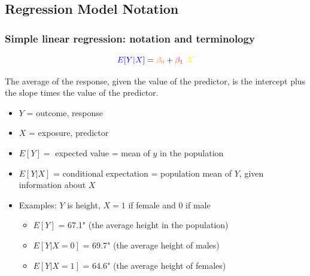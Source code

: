 \documentclass[12pt, 
hyperref={colorlinks=true, linkcolor=blue, urlcolor=cyan},dvipsnames]{beamer}
\begin{document}
\subsection{Regression Model Notation}
\begin{frame}
\frametitle{Simple linear regression: notation and terminology}
$$\color{blue} E[Y|X] \color{black} = \color{orange} \beta_0 \color{black} + \color{red} \beta_1 \color{yellow} \ X$$ \vspace{-0.6cm}

\color{blue}The average of the response, given the value of the predictor, \color{black} is \color{orange} the intercept \color{black} plus \color{red} the slope \color{black} times \color{yellow} the value of the predictor.\color{black} \pause

\vspace{-0.2cm}
\begin{itemize}
\item $Y$ = outcome, response
\item $X$ = exposure, predictor \pause
\item $E[Y] =$ expected value =  mean of $y$ in the population \pause
\item $E[Y|X]$ = conditional expectation = population mean of $Y$, given information about $X$	\pause
\item Examples: $Y$ is height, $X = 1$ if female and $0$ if male
	\begin{itemize}
	\item $E[Y]$ = 67.1" (the average height in the population)
	\item $E[Y|X = 0]$ = 69.7" (the average height of males)
	\item $E[Y|X = 1]$ = 64.6" (the average height of females)
	\end{itemize}
\end{itemize}
\end{frame}

\end{document}
